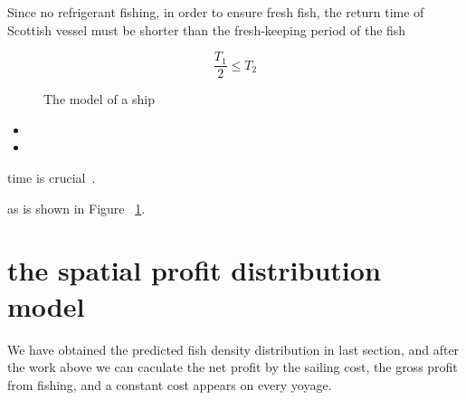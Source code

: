\documentclass{mcmthesis}
\begin{document}
Since no refrigerant fishing, in order to ensure fresh fish, the return time of Scottish vessel  must be shorter than the fresh-keeping period of the fish

\begin{equation}\label{10}
\frac{T_1}{2}\leq T_2
\end{equation}

\begin{figure}[tbp]
  \caption{The model of a ship}\label{figure1}
\end{figure}
 

\begin{itemize}

\item 
\item 
\end{itemize}




time is crucial~\cite{Sayyady2010Optimizing,So2010Managing}.



as is shown in Figure ~\ref{figure1}.

\section{the spatial profit distribution model}
  We have obtained the predicted fish density distribution in last section, and after the work above we can caculate the net profit by the sailing cost, the gross profit from fishing, and a constant cost appears on every yoyage.
  
\end{document}
